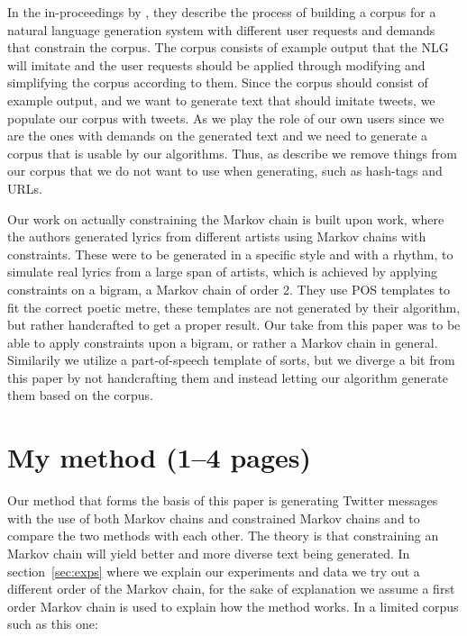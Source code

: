 \documentclass[a4paper,12pt]{article}
\begin{document}
In the in-proceedings by \cite{Corpus}, they describe the process of building a corpus for a natural language generation system with different user requests and demands that constrain the corpus. 
The corpus consists of example output that the NLG will imitate and the user requests should be applied through modifying and simplifying the corpus according to them.
Since the corpus should consist of example output, and we want to generate text that should imitate tweets, we populate our corpus with tweets.
As we play the role of our own users since we are the ones with demands on the generated text and we need to generate a corpus that is usable by our algorithms. Thus, as \citep{Corpus} describe we remove things from our corpus that we do not want to use when generating, such as hash-tags and URLs.


Our work on actually constraining the Markov chain is built upon \cite{McBarb} work, 
where the authors generated lyrics from different artists using Markov chains with constraints. 
These were to be generated in a specific style and with a rhythm, to simulate real lyrics from a large span of artists, which is achieved by applying constraints on a bigram, a Markov chain of order 2.
They use POS templates to fit the correct poetic metre, these templates are not generated by their algorithm, but rather handcrafted to get a proper result.
Our take from this paper was to be able to apply constraints upon a bigram, or rather a Markov chain in general. Similarily we utilize a part-of-speech template of sorts, but we diverge a bit from this paper by not handcrafting them and instead letting our algorithm generate them based on the corpus.


\section{My method (1--4 pages)}
\label{sec:method}
Our method that forms the basis of this paper is generating Twitter messages with the use of both Markov chains and constrained Markov chains and to compare the two methods with each other.
The theory is that constraining an Markov chain will yield better and more diverse text being generated. 
In section~\ref{sec:exps} where we explain our experiments and data we try out a different order of the Markov chain, 
for the sake of explanation we assume a first order Markov chain is used to explain how the method works. 
In a limited corpus such as this one: \\
\end{document}
